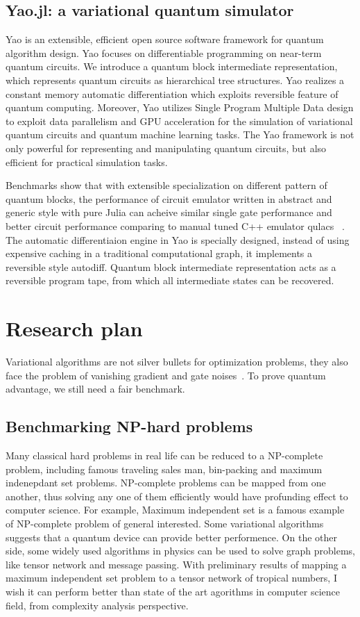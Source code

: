 \documentclass[]{article}
\begin{document}
\subsection{Yao.jl: a variational quantum simulator}
Yao is an extensible, efficient open source software framework for
quantum algorithm design. Yao focuses on differentiable programming on near-term quantum circuits. 
We introduce a quantum block intermediate representation, which represents quantum circuits as hierarchical tree structures. 
Yao realizes a constant memory automatic differentiation which exploits reversible feature of quantum computing. 
Moreover, Yao utilizes Single Program Multiple Data design to exploit data parallelism and GPU acceleration for the simulation of variational quantum circuits and quantum machine learning tasks. 
The Yao framework is not only powerful for representing and manipulating quantum
circuits, but also efficient for practical simulation tasks. 

Benchmarks show that with extensible specialization on different pattern of quantum blocks, the performance of
circuit emulator written in abstract and generic style with pure Julia can acheive similar single gate performance and
better circuit performance comparing to manual tuned C++ emulator qulacs~\cite{qulacs2019variational} . 
The automatic differentiaion engine in Yao is specially designed, instead of using expensive caching in a traditional computational graph, it implements a reversible style autodiff.
Quantum block intermediate representation acts as a reversible program tape, from which all intermediate states can be recovered.

\section{Research plan}
Variational algorithms are not silver bullets for optimization problems, they also face the problem of vanishing gradient and gate noises~\cite{}.
To prove quantum advantage, we still need a fair benchmark.

\subsection{Benchmarking NP-hard problems}
Many classical hard problems in real life can be reduced to a NP-complete problem, including famous traveling sales man, bin-packing and maximum indenepdant set problems. NP-complete problems can be mapped from one another, thus solving any one of them efficiently would have profunding effect to computer science.
For example, Maximum independent set is a famous example of NP-complete problem of general interested. Some variational algorithms suggests that a quantum device can provide better performence.
On the other side, some widely used algorithms in physics can be used to solve graph problems, like tensor network and message passing.
With preliminary results of mapping a maximum independent set problem to a tensor network of tropical numbers, I wish it can perform better than state of the art agorithms in computer science field, from complexity analysis perspective.
\end{document}
